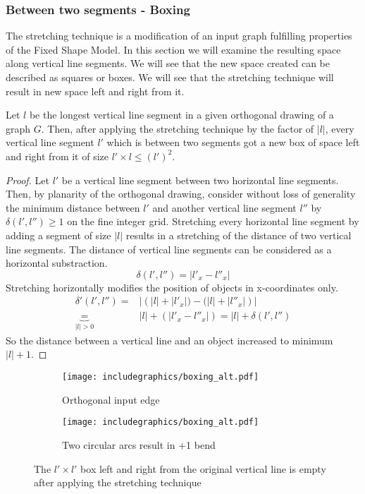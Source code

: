 \subsubsection{Between two segments - \grqq Boxing\grqq}
The stretching technique is a modification of an input graph fulfilling properties of the Fixed Shape Model. In this section we will examine the resulting space along vertical line segments. We will see that the new space created can be described as squares or \grqq boxes\grqq.
We will see that the stretching technique will result in new space left and right from it.
\begin{lemma}
	Let $l$ be the longest vertical line segment in a given orthogonal drawing of a graph $G$. Then, after applying the stretching technique by the factor of $|l|$, every vertical line segment $l'$ which is between two segments got a new box of space left and right from it of size $l'\times l \leq (l')^2$.\label{lem:space_stretch}
\end{lemma}
\begin{proof}
	Let $l'$ be a vertical line segment between two horizontal line segments. Then, by planarity of the orthogonal drawing, consider without loss of generality the minimum distance between $l'$ and another vertical line segment $l''$ by $\delta(l',l'') \geq 1$ on the fine integer grid. Stretching every horizontal line segment by adding a segment of size $|l|$ results in a stretching of the distance of two vertical line segments. The distance of vertical line segments can be considered as a horizontal substraction. $$\delta(l',l'') = |l'_x - l''_x|$$
Stretching horizontally modifies the position of objects in x-coordinates only.
\begin{align}
\delta'(l',l'') = &|\left(|l| + |l'_x|) - (|l| + |l''_x|\right)|\\
 \underbrace{=}_{|l| > 0} &|l| + \left(|l'_x - l''_x|\right) = |l| + \delta(l',l'')
\end{align}
So the distance between a vertical line and an object increased to minimum $|l|+1$.
\end{proof}
\begin{figure}[h]
	\centering
	\begin{subfigure}{0.3\textwidth}
			\centering
			\texttt{[image: includegraphics/boxing\_alt.pdf]}
			\caption{Orthogonal input edge}
	\end{subfigure}
	\begin{subfigure}{0.66\textwidth}
			\centering
			\texttt{[image: includegraphics/boxing\_alt.pdf]}
			\caption{Two circular arcs result in +1 bend}
\end{subfigure}
	\caption{The $l'\times l'$ box left and right from the original vertical line is empty after applying the stretching technique}
\end{figure}
